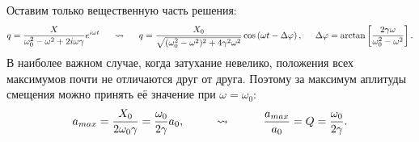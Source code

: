 Оставим только вещественную часть решения:
\begin{equation}
	q = \frac{X}{\omega_0^2 - \omega^2 + 2 i \omega \gamma} e^{i \omega t} 
	\hspace{0.5 cm } 	\leadsto \hspace{0.5 cm}
	q = \frac{X_0}{\sqrt{(\omega_0^2 - \omega^2)^2 + 4 \gamma^2 \omega^2}} \cos\left(\omega t - \Delta \varphi\right), \hspace{0.5cm} \Delta \varphi = \arctan\left[\frac{2 \gamma \omega}{\omega_0^2 - \omega^2}\right].
\end{equation}
В наиболее важном случае, когда затухание невелико, положения всех максимумов почти не отличаются друг от друга. Поэтому за максимум аплитуды смещения можно принять её значение при $\omega = \omega_0 $:
\begin{equation}
	a_{max} = \frac{X_0}{2 \omega_0 \gamma} = \frac{\omega_0}{2 \gamma} a_0,
	 \hspace*{1 cm} 
	\leadsto 
	\hspace*{1 cm} \frac{a_{max}}{a_0} = Q = \frac{\omega_0}{2 \gamma}.
\end{equation}
